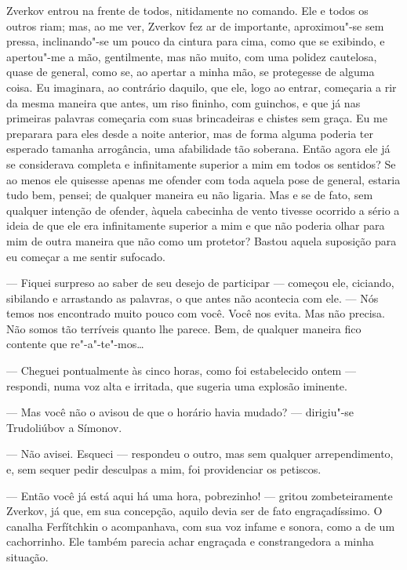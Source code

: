 Zverkov entrou na frente de todos, nitidamente no comando. Ele e todos
os outros riam; mas, ao me ver, Zverkov fez ar de importante,
aproximou"-se sem pressa, inclinando"-se um pouco da cintura para cima,
como que se exibindo, e apertou"-me a mão, gentilmente, mas não muito,
com uma polidez cautelosa, quase de general, como se, ao apertar a
minha mão, se protegesse de alguma coisa. Eu imaginara, ao contrário
daquilo, que ele, logo ao entrar, começaria a rir da mesma maneira que
antes, um riso fininho, com guinchos, e que já nas primeiras palavras
começaria com suas brincadeiras e chistes sem graça. Eu me preparara
para eles desde a noite anterior, mas de forma alguma poderia ter
esperado tamanha arrogância, uma afabilidade tão soberana. Então agora
ele já se considerava completa e infinitamente superior a mim em todos
os sentidos? Se ao menos ele quisesse apenas me ofender com toda aquela
pose de general, estaria tudo bem, pensei; de qualquer maneira eu não
ligaria. Mas e se de fato, sem qualquer intenção de ofender, àquela
cabecinha de vento tivesse ocorrido a sério a ideia de que ele era
infinitamente superior a mim e que não poderia olhar para mim de outra
maneira que não como um protetor? Bastou aquela suposição para eu
começar a me sentir sufocado.

--- Fiquei surpreso ao saber de seu desejo de participar --- começou ele,
ciciando, sibilando e arrastando as palavras, o que antes não acontecia
com ele. --- Nós temos nos encontrado muito pouco com você. Você nos
evita. Mas não precisa. Não somos tão terríveis quanto lhe parece. Bem,
de qualquer maneira fico contente que re"-a"-te"-mos\ldots{}



--- Cheguei pontualmente às cinco horas, como foi estabelecido ontem ---
respondi, numa voz alta e irritada, que sugeria uma explosão iminente.

--- Mas você não o avisou de que o horário havia mudado? --- dirigiu"-se
Trudoliúbov a Símonov.

--- Não avisei. Esqueci --- respondeu o outro, mas sem qualquer
arrependimento, e, sem sequer pedir desculpas a mim, foi providenciar
os petiscos.

--- Então você já está aqui há uma hora, pobrezinho! --- gritou
zombeteiramente Zverkov, já que, em sua concepção, aquilo devia ser de
fato engraçadíssimo. O canalha Ferfítchkin o acompanhava, com sua voz
infame e sonora, como a de um cachorrinho. Ele também parecia achar
engraçada e constrangedora a minha situação.

